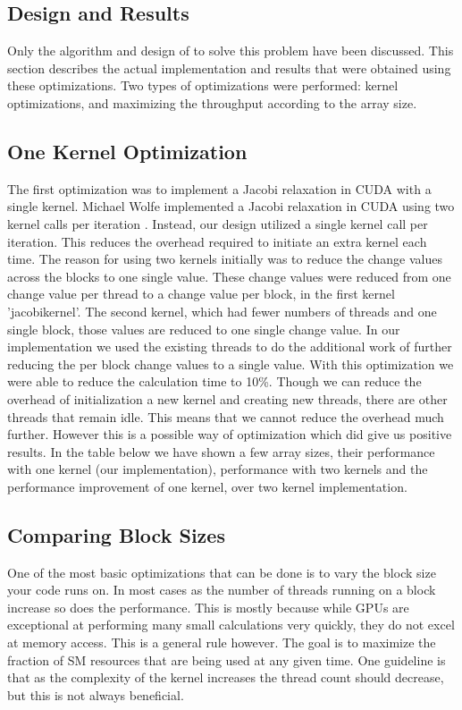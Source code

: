 \documentclass[10pt]{article}
\begin{document}
\begin{multicols}{2}
  \section{Design and Results} %
  Only the algorithm and design of to solve this problem have been discussed.
  This section describes the actual implementation and results that were obtained using these optimizations.
  Two types of optimizations were performed: kernel optimizations, and maximizing the throughput according to the array size.
  \subsection{One Kernel Optimization}
  The first optimization was to implement a Jacobi relaxation in CUDA with a single kernel.
  Michael Wolfe implemented a Jacobi relaxation in CUDA using two kernel calls per iteration \cite{michael}.
  Instead, our design utilized a single kernel call per iteration.
  This reduces the overhead required to initiate an extra kernel each time.
  The reason for using two kernels initially was to reduce the change values across the blocks to one single value.
  These change values were reduced from one change value per thread to a change value per block, in the first kernel 'jacobikernel'.
  The second kernel, which had fewer numbers of threads and one single block, those values are reduced to one single change value.
  In our implementation we used the existing threads to do the additional work of further reducing the per block change values to a single value.
  With this optimization we were able to reduce the calculation time to 10\%.
  Though we can reduce the overhead of initialization a new kernel and creating new threads, there are other threads that remain idle.
  This means that we cannot reduce the overhead much further.
  However this is a possible way of optimization which did give us positive results.
  In the table below we have shown a few array sizes, their performance with one kernel (our implementation), performance with two kernels \cite{michael} and the performance improvement of one kernel, over two kernel implementation.

  \subsection{Comparing Block Sizes}
  One of the most basic optimizations that can be done is to vary the block size your code runs on.
  In most cases as the number of threads running on a block increase so does the performance.
  This is mostly because while GPUs are exceptional at performing many small calculations very quickly, they do not excel at memory access.
  This is a general rule however.
  The goal is to maximize the fraction of SM resources that are being used at any given time.
  One guideline is that as the complexity of the kernel increases the thread count should decrease, but this is not always beneficial.


\end{multicols}
\end{document}
